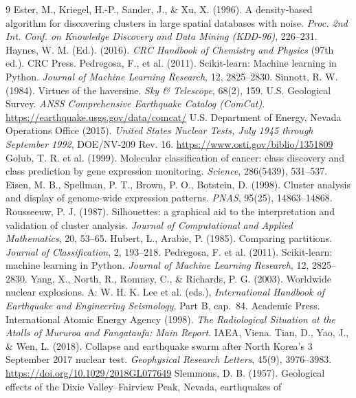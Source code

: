 \documentclass[a4paper,11pt]{article}
\begin{document}
\clearpage
\begin{thebibliography}{9}
 Ester, M., Kriegel, H.-P., Sander, J., \& Xu, X. (1996). A density-based algorithm for discovering
clusters in large spatial databases with noise. \textit{Proc. 2nd Int. Conf. on Knowledge Discovery and Data Mining (KDD-96)}, 226--231.
 Haynes, W. M. (Ed.). (2016). \textit{CRC Handbook of Chemistry and Physics} (97th ed.). CRC Press.
 Pedregosa, F., et al. (2011). Scikit-learn: Machine learning in Python. \textit{Journal of Machine
Learning Research}, 12, 2825--2830.
 Sinnott, R. W. (1984). Virtues of the haversine. \textit{Sky \& Telescope}, 68(2), 159.
 U.S. Geological Survey. \textit{ANSS Comprehensive Earthquake Catalog (ComCat)}.
\url{https://earthquake.usgs.gov/data/comcat/}
 U.S. Department of Energy, Nevada Operations Office (2015). \textit{United States Nuclear Tests, July 1945
through September 1992}, DOE/NV-209 Rev. 16. \url{https://www.osti.gov/biblio/1351809}
 Golub, T. R. et al. (1999). Molecular classification of cancer: class discovery and class prediction by gene expression monitoring. \textit{Science}, 286(5439), 531--537.
 Eisen, M. B., Spellman, P. T., Brown, P. O., Botstein, D. (1998). Cluster analysis and display of genome-wide expression patterns. \textit{PNAS}, 95(25), 14863--14868.
 Rousseeuw, P. J. (1987). Silhouettes: a graphical aid to the interpretation and validation of cluster analysis. \textit{Journal of Computational and Applied Mathematics}, 20, 53--65.
 Hubert, L., Arabie, P. (1985). Comparing partitions. \textit{Journal of Classification}, 2, 193--218.
 Pedregosa, F. et al. (2011). Scikit-learn: machine learning in Python. \textit{Journal of Machine Learning Research}, 12, 2825--2830.
 Yang, X., North, R., Romney, C., \& Richards, P. G. (2003). Worldwide nuclear explosions. A: W. H. K. Lee
et al. (eds.), \textit{International Handbook of Earthquake and Engineering Seismology}, Part B, cap.~84. Academic Press.
 International Atomic Energy Agency (1998). \textit{The Radiological Situation at the Atolls of Mururoa and
Fangataufa: Main Report}. IAEA, Viena.
 Tian, D., Yao, J., \& Wen, L. (2018). Collapse and earthquake swarm after North Korea's 3 September 2017
nuclear test. \textit{Geophysical Research Letters}, 45(9), 3976--3983. \url{https://doi.org/10.1029/2018GL077649}
 Slemmons, D. B. (1957). Geological effects of the Dixie Valley--Fairview Peak, Nevada, earthquakes of

\end{thebibliography}
\end{document}
